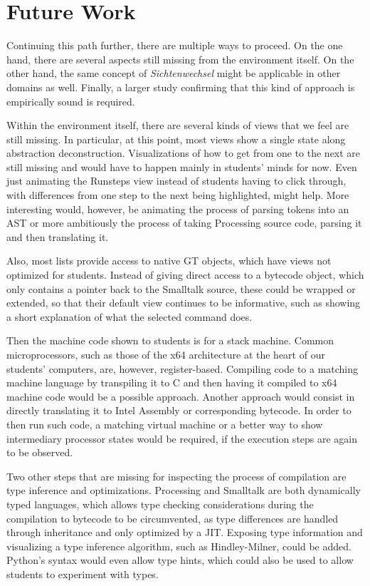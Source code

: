 \section{Future Work} \label{sc_future}

Continuing this path further, there are multiple ways to proceed. On the one hand, there are several aspects still missing from the environment itself. On the other hand, the same concept of \emph{Sichtenwechsel} might be applicable in other domains as well. Finally, a larger study confirming that this kind of approach is empirically sound is required.

Within the environment itself, there are several kinds of views that we feel are still missing. In particular, at this point, most views show a single state along abstraction deconstruction. Visualizations of how to get from one to the next are still missing and would have to happen mainly in students' minds for now. Even just animating the Runsteps view instead of students having to click through, with differences from one step to the next being highlighted, might help. More interesting would, however, be animating the process of parsing tokens into an \ac{AST} or more ambitiously the process of taking Processing source code, parsing it and then translating it.

Also, most lists provide access to native \ac{GT} objects, which have views not optimized for students. Instead of \eg giving direct access to a bytecode object, which only contains a pointer back to the Smalltalk source, these could be wrapped or extended, so that their default view continues to be informative, such as showing a short explanation of what the selected command does.

Then the machine code shown to students is for a stack machine. Common microprocessors, such as those of the x64 architecture at the heart of our students' computers, are, however, register-based. Compiling code to a matching machine language by \eg transpiling it to C and then having it compiled to x64 machine code would be a possible approach. Another approach would consist in directly translating it to Intel Assembly or corresponding bytecode. In order to then run such code, a matching virtual machine or a better way to show intermediary processor states would be required, if the execution steps are again to be observed.

Two other steps that are missing for inspecting the process of compilation are type inference and optimizations. Processing and Smalltalk are both dynamically typed languages, which allows type checking considerations during the compilation to bytecode to be circumvented, as type differences are handled through inheritance and only optimized by a \ac{JIT}. Exposing type information and visualizing a type inference algorithm, such as Hindley-Milner, could be added. Python's syntax would even allow type hints, which could also be used to allow students to experiment with types.

